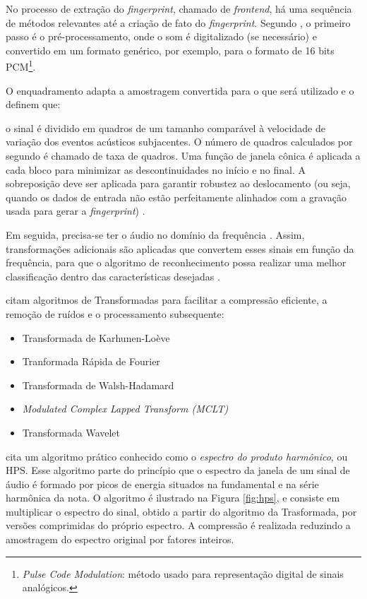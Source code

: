 No processo de extração do \textit{fingerprint}, chamado de \textit{frontend}, há uma sequência de métodos relevantes até a criação de fato do \textit{fingerprint}. Segundo , o primeiro passo é o pré-processamento, onde o som é digitalizado (se necessário) e convertido em um formato genérico, por exemplo, para o formato de 16 bits PCM\footnote{\textit{Pulse Code Modulation}: método usado para representação digital de sinais analógicos.}.

O enquadramento adapta a amostragem convertida para o que será utilizado e  o definem que:

\begin{citacao}
[...]o sinal é dividido em quadros de um tamanho comparável à velocidade de variação dos eventos acústicos subjacentes. O número de quadros calculados por segundo é chamado de taxa de quadros. Uma função de janela cônica é aplicada a cada bloco para minimizar as descontinuidades no início e no final. A sobreposição deve ser aplicada para garantir robustez ao deslocamento (ou seja, quando os dados de entrada não estão perfeitamente alinhados com a gravação usada para gerar a \textit{fingerprint}) \cite{cano2005}.
\end{citacao}

Em seguida, precisa-se ter o áudio no domínio da frequência \cite{bunnell1996a}. Assim, transformações adicionais são aplicadas que convertem esses sinais em função da frequência, para que o algoritmo de reconhecimento possa realizar uma melhor classificação dentro das características desejadas \cite{santos2011}.

 citam algoritmos de Transformadas para facilitar a compressão eficiente, a remoção de ruídos e o processamento subsequente:

\begin{itemize}
    \item Transformada de Karhunen-Loève
    \item Tranformada Rápida de Fourier
    \item Transformada de Walsh-Hadamard
    \item \textit{Modulated Complex Lapped Transform (MCLT)}
    \item Transformada Wavelet
\end{itemize}

 cita um algoritmo prático conhecido como o \textit{espectro do produto harmônico}, ou HPS. Esse algoritmo parte do princípio que o espectro da janela de um sinal de áudio é formado por picos de energia situados na fundamental e na série harmônica da nota. O algoritmo é ilustrado na Figura \ref{fig:hps}, e consiste em multiplicar o espectro do sinal, obtido a partir do algoritmo da Trasformada, por versões comprimidas do próprio espectro. A compressão é realizada reduzindo a amostragem do espectro original por fatores inteiros.

